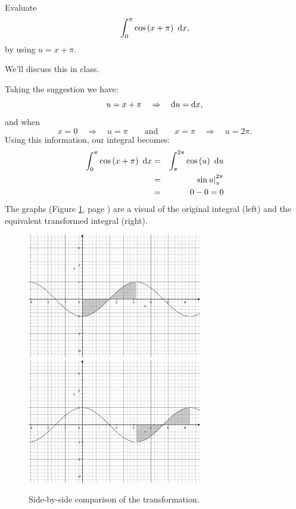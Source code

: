 \documentclass[12pt,addpoints, answers, fleqn]{exam}
\begin{document}
\begin{questions}
\question Evaluate
\[
\int_{0}^{\pi} \cos \left( x + \pi \right)  \ {\rm{d}} x,
\]
by using $u = x + \pi$.

\begin{solution}
We'll discuss this in class.

Taking the suggestion we have:
\[
u = x + \pi \quad \Rightarrow \quad {\rm{d}} u = {\rm{d}} x,
\]
and when
\[
x=0 \quad \Rightarrow \quad u = \pi \qquad \mbox{and}\qquad
x=\pi \quad \Rightarrow \quad u = 2\pi. 
\]
Using this information, our integral becomes:
\begin{eqnarray*}
\int_{0}^{\pi} \cos \left( x + \pi \right)  \ {\rm{d}} x &=& \int_{\pi}^{2\pi} \cos \left( u \right)  \ {\rm{d}} u\\
&=& \left. \sin u \right|_{\pi}^{2\pi}\\
&=& 0 - 0 = 0
\end{eqnarray*}
The graphs (Figure \ref{fig:graph3004}, page \pageref{fig:graph3004}) are a visual of the original integral (left) and the equivalent transformed integral (right). 
\end{solution}
\begin{figure}[htbp] %
   \centering
   \includegraphics[width=3in]{./graphics/graph3003.pdf}
   \includegraphics[width=3in]{./graphics/graph3004.pdf} 
   \caption{Side-by-side comparison of the transformation.}
   \label{fig:graph3004}
\end{figure}



\end{questions}
\end{document}

